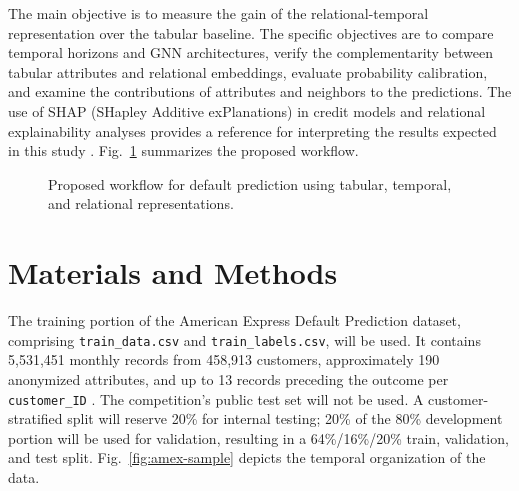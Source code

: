 \documentclass[conference]{IEEEtran}
\begin{document}
The main objective is to measure the gain of the relational-temporal representation over the tabular baseline. The specific objectives are to compare temporal horizons and GNN architectures, verify the complementarity between tabular attributes and relational embeddings, evaluate probability calibration, and examine the contributions of attributes and neighbors to the predictions. The use of SHAP (SHapley Additive exPlanations) in credit models and relational explainability analyses provides a reference for interpreting the results expected in this study \cite{BITETTO2023101746,yang2025interpretable,yang2026relationalgraphmodelingcredit}. Fig.~\ref{fig:diagram-solution-planning} summarizes the proposed workflow.

\begin{figure}[htbp]
    \centering
    
    \vspace{-2mm}
    \caption{Proposed workflow for default prediction using tabular, temporal, and relational representations.}
    \label{fig:diagram-solution-planning}
\end{figure}

\section{Materials and Methods}
\label{sec:materials}

The training portion of the American Express Default Prediction dataset, comprising \texttt{train\_data.csv} and \texttt{train\_labels.csv}, will be used. It contains 5,531,451 monthly records from 458,913 customers, approximately 190 anonymized attributes, and up to 13 records preceding the outcome per \texttt{customer\_ID} \cite{amex-default-prediction}. The competition's public test set will not be used. A customer-stratified split will reserve 20\% for internal testing; 20\% of the 80\% development portion will be used for validation, resulting in a 64\%/16\%/20\% train, validation, and test split. Fig.~\ref{fig:amex-sample} depicts the temporal organization of the data.
\end{document}
